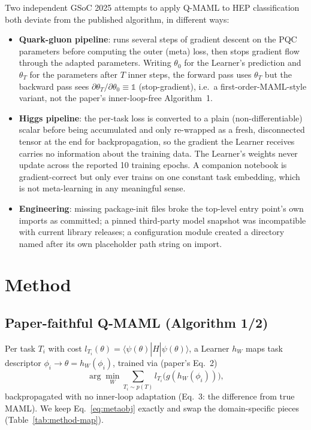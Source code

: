 \documentclass[11pt]{article}
\begin{document}
Two independent GSoC 2025 attempts to apply Q-MAML to HEP classification both deviate from the published
algorithm, in different ways:

\begin{itemize}[nosep]
    \item \textbf{Quark-gluon pipeline}: runs several steps of gradient descent on the PQC parameters before
    computing the outer (meta) loss, then stops gradient flow through the adapted parameters. Writing
    $\theta_0$ for the Learner's prediction and $\theta_T$ for the parameters after $T$ inner steps, the
    forward pass uses $\theta_T$ but the backward pass sees
    $\partial\theta_T/\partial\theta_0 \equiv \mathbb{1}$ (stop-gradient), i.e.\ a first-order-MAML-style
    variant, not the paper's inner-loop-free Algorithm~1.
    \item \textbf{Higgs pipeline}: the per-task loss is converted to a plain (non-differentiable) scalar
    before being accumulated and only re-wrapped as a fresh, disconnected tensor at the end for
    backpropagation, so the gradient the Learner receives carries no information about the training data.
    The Learner's weights never update across the reported 10 training epochs. A companion notebook is
    gradient-correct but only ever trains on one constant task embedding, which is not meta-learning in any
    meaningful sense.
    \item \textbf{Engineering}: missing package-init files broke the top-level entry point's own imports as
    committed; a pinned third-party model snapshot was incompatible with current library releases; a
    configuration module created a directory named after its own placeholder path string on import.
\end{itemize}

\section{Method}
\label{sec:method}

\subsection{Paper-faithful Q-MAML (Algorithm 1/2)}

Per task $T_i$ with cost $l_{T_i}(\theta)=\langle\psi(\theta)|\hat H|\psi(\theta)\rangle$, a Learner $h_W$
maps task descriptor $\phi_i\to\theta=h_W(\phi_i)$, trained via (paper's Eq.~2)
\begin{equation}
\label{eq:metaobj}
\arg\min_W \sum_{T_i\sim p(T)} l_{T_i}\big(g(h_W(\phi_i))\big),
\end{equation}
backpropagated with no inner-loop adaptation (Eq.~3: the difference from true MAML). We keep
Eq.~\ref{eq:metaobj} exactly and swap the domain-specific pieces (Table~\ref{tab:method-map}).
\end{document}
